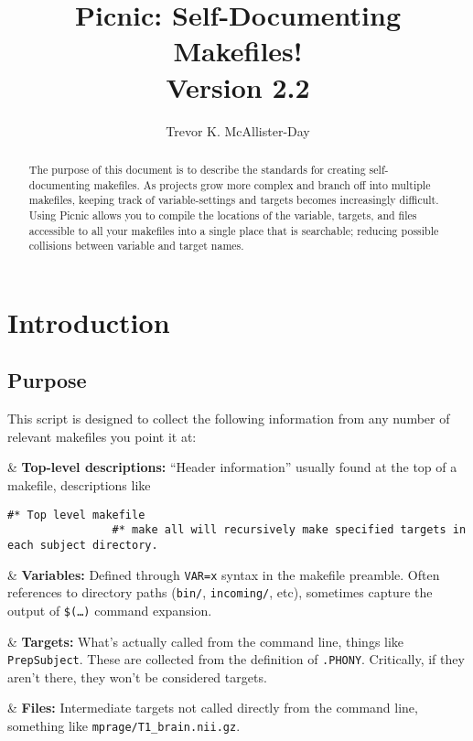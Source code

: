 \documentclass[oneside,11pt]{article}
\title{Picnic: Self-Documenting Makefiles! \\ Version 2.2}
\author{Trevor K. McAllister-Day}
\affil{\url{tkmday@uw.edu}}
\begin{document}
	
	\maketitle
	
	\tableofcontents
	
	\begin{abstract}
		The purpose of this document is to describe the standards for creating 
		self-documenting makefiles. As projects grow more complex and branch 
		off into multiple makefiles, keeping track of variable-settings and 
		targets becomes increasingly difficult. Using Picnic allows you to 
		compile the locations of the variable, targets, and files accessible to 
		all your makefiles into a single place that is searchable; reducing 
		possible collisions between variable and target names.
	\end{abstract}
	
	\section{Introduction}
	
	\subsection{Purpose}
	
	This script is designed to collect the following information from any number of relevant makefiles you point it at:
	
	\begin{easylist}[itemize]
		
		& \textbf{Top-level descriptions:} ``Header information'' usually found at the top of a makefile, descriptions like
			\begin{lstlisting}[basicstyle=\ttfamily, gobble=24, breaklines=true]
				#* Top level makefile
				#* make all will recursively make specified targets in each subject directory.
			\end{lstlisting}
			
		& \textbf{Variables:} Defined through \texttt{VAR=x} syntax in the 
		makefile preamble. Often references to directory paths (\texttt{bin/}, 
		\texttt{incoming/}, etc), sometimes capture the output of 
		\texttt{\$(\ldots)} command expansion.
		
		& \textbf{Targets:} What's actually called from the command line, 
		things like \texttt{PrepSubject}. These are collected from the 
		definition of \texttt{.PHONY}. Critically, if they aren't there, they 
		won't be considered targets.
			\begin{center}
			\end{center}
			
		& \textbf{Files:} Intermediate targets not called directly from the 
		command line, something like \texttt{mprage/T1\_brain.nii.gz}.
		
	\end{easylist}
	
\end{document}
